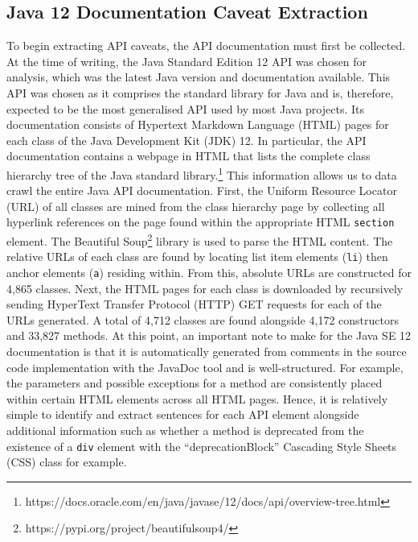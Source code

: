 \subsection{Java 12 Documentation Caveat Extraction}
\label{subsec:info-caveat-extract}
To begin extracting API caveats, the API documentation must first be collected. At the time of writing, the Java Standard Edition 12 API was chosen for analysis, which was the latest Java version and documentation available. This API was chosen as it comprises the standard library for Java and is, therefore, expected to be the most generalised API used by most Java projects. Its documentation consists of Hypertext Markdown Language (HTML) pages for each class of the Java Development Kit (JDK) 12. In particular, the API documentation contains a webpage in HTML that lists the complete class hierarchy tree of the Java standard library.\footnote{https://docs.oracle.com/en/java/javase/12/docs/api/overview-tree.html} This information allows us to data crawl the entire Java API documentation. First, the Uniform Resource Locator (URL) of all classes are mined from the class hierarchy page by collecting all hyperlink references on the page found within the appropriate HTML \lstinline{section} element. The Beautiful Soup\footnote{https://pypi.org/project/beautifulsoup4/} library is used to parse the HTML content. The relative URLs of each class are found by locating list item elements (\lstinline{li}) then anchor elements (\lstinline{a}) residing within. From this, absolute URLs are constructed for 4,865 classes. Next, the HTML pages for each class is downloaded by recursively sending HyperText Transfer Protocol (HTTP) GET requests for each of the URLs generated. A total of 4,712 classes are found alongside 4,172 constructors and 33,827 methods. At this point, an important note to make for the Java SE 12 documentation is that it is automatically generated from comments in the source code implementation with the JavaDoc tool and is well-structured. For example, the parameters and possible exceptions for a method are consistently placed within certain HTML elements across all HTML pages. Hence, it is relatively simple to identify and extract sentences for each API element alongside additional information such as whether a method is deprecated from the existence of a \lstinline{div} element with the ``deprecationBlock'' Cascading Style Sheets (CSS) class for example.\bigbreak

